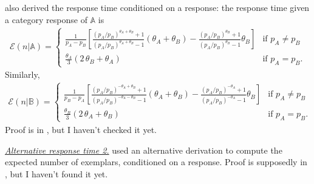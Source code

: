 \documentclass[doc]{apa6}
\newcommand{\subsubsubsection}[1]{\textit{\underline{#1}}}
\begin{document}
\textcite{Nosofsky1997a} also derived the response time conditioned on a response: the response
time given a category response of $\mathbb{A}$ is
\begin{align}
    \mathcal{E}(n \vert \mathbb{A}) = \left\{
        \begin{array}{ll}
            \displaystyle
            \frac{1}{p_{A} - p_{B}} \left[
                \frac{{\left(p_{A} / p_{B} \right)}^{\theta_{A} + \theta_{B}} + 1}
                     {{\left(p_{A} / p_{B} \right)}^{\theta_{A} + \theta_{B}} - 1}
                (\theta_{A} + \theta_{B}) -
                \frac{{\left(p_{A} / p_{B} \right)}^{\theta_{B}} + 1}
                     {{\left(p_{A} / p_{B} \right)}^{\theta_{B}} - 1}
                \theta_{B}
                \right] & \mbox{if } p_{A} \neq p_{B} \\
            \displaystyle
            \frac{\theta_{A}}{3}\left(2\, \theta_{B} + \theta_{A} \right)
                & \mbox{if } p_{A} = p_{B}.
        \end{array}
    \right.
\end{align}
Similarly,
\begin{align}
    \mathcal{E}(n \vert \mathbb{B}) = \left\{
        \begin{array}{ll}
            \displaystyle
            \frac{1}{p_{B} - p_{A}} \left[
                \frac{{\left(p_{A} / p_{B} \right)}^{-\theta_{A} + \theta_{B}} + 1}
                     {{\left(p_{A} / p_{B} \right)}^{-\theta_{A} - \theta_{B}} - 1}
                (\theta_{A} + \theta_{B}) -
                \frac{{\left(p_{A} / p_{B} \right)}^{-\theta_{A}} + 1}
                     {{\left(p_{A} / p_{B} \right)}^{-\theta_{A}} - 1}
                \theta_{B}
                \right] & \mbox{if } p_{A} \neq p_{B} \\
            \displaystyle
            \frac{\theta_{B}}{3}\left(2\, \theta_{A} + \theta_{B} \right)
                & \mbox{if } p_{A} = p_{B}.
        \end{array}
    \right.
\end{align}
Proof is in \textcite{Busemeyer1982a}, but I haven't checked it yet.

\subsubsubsection{Alternative response time 2.} \textcite{Diederich2003a} used an alternative
derivation to compute the expected number of exemplars, conditioned on a response. Proof is
supposedly in \textcite{Diederich1995a}, but I haven't found it yet.
\end{document}
